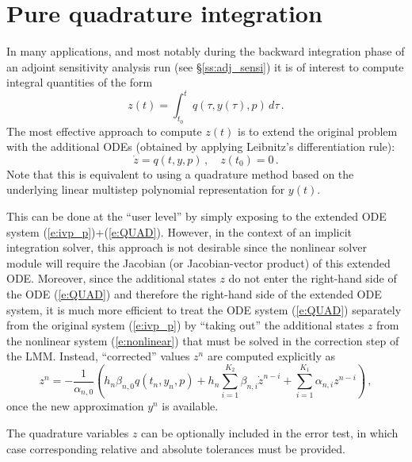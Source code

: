 \section{Pure quadrature integration}\label{s:quad}

In many applications, and most notably during the backward integration phase
of an adjoint sensitivity analysis run (see \S\ref{ss:adj_sensi}) it is of
interest to compute integral quantities of the form
\begin{equation}\label{e:QUAD}
  z(t) = \int_{t_0}^t q(\tau, y(\tau), p) \, d\tau \, .
\end{equation}
The most effective approach to compute $z(t)$ is to extend the original problem
with the additional ODEs (obtained by applying Leibnitz's differentiation rule):
\begin{equation}
  \dot z = q(t,y,p) \, , \quad z(t_0) = 0 \, .
\end{equation}
Note that this is equivalent to using a quadrature method based on the underlying
linear multistep polynomial representation for $y(t)$.

This can be done at the ``user level'' by simply exposing to {\cvodes} the extended 
ODE system (\ref{e:ivp_p})+(\ref{e:QUAD}). However, in the context of an implicit 
integration solver, this approach is not desirable since the nonlinear solver 
module will require the Jacobian (or Jacobian-vector product) of this extended ODE.
Moreover, since the additional states $z$ do not enter the right-hand side of
the ODE (\ref{e:QUAD}) and therefore the right-hand side of the extended ODE system,
it is much more efficient to treat the ODE system (\ref{e:QUAD})
separately from the original system (\ref{e:ivp_p}) by ``taking out'' the additional
states $z$ from the nonlinear system (\ref{e:nonlinear}) that must be solved in
the correction step of the LMM. Instead, ``corrected'' values $z^n$ are computed
explicitly as
\begin{equation*}
  z^n = - \frac{1}{\alpha_{n,0}} \left(
    h_n \beta_{n,0} q(t_n, y_n, p) 
    + h_n \sum_{i=1}^{K_2} \beta_{n,i} \dot z^{n-i}
    + \sum_{i=1}^{K_1} \alpha_{n,i} z^{n-i}
    \right) \, ,
\end{equation*}
once the new approximation $y^n$ is available.

The quadrature variables $z$ can be optionally included in the error test, in 
which case corresponding relative and absolute tolerances must be provided.


